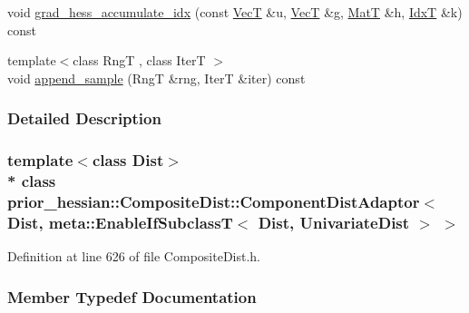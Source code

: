 \begin{DoxyCompactItemize}
\item 
void \hyperlink{classprior__hessian_1_1CompositeDist_1_1ComponentDistAdaptor_3_01Dist_00_01meta_1_1EnableIfSubclc6c9bd83bba546a81e521c87ad7ee6d3_ac58aa66e75b8ca803919fded5da5d5f9}{grad\+\_\+hess\+\_\+accumulate\+\_\+idx} (const \hyperlink{namespaceprior__hessian_a0b42fc70dec525d83fb2ac155d9ab974}{VecT} \&u, \hyperlink{namespaceprior__hessian_a0b42fc70dec525d83fb2ac155d9ab974}{VecT} \&g, \hyperlink{namespaceprior__hessian_aab58331a34ed4ef22b6022564fe74be3}{MatT} \&h, \hyperlink{namespaceprior__hessian_aa8d589f74e88bfa3b5750118acd1ab78}{IdxT} \&k) const 
\item 
{\footnotesize template$<$class RngT , class IterT $>$ }\\void \hyperlink{classprior__hessian_1_1CompositeDist_1_1ComponentDistAdaptor_3_01Dist_00_01meta_1_1EnableIfSubclc6c9bd83bba546a81e521c87ad7ee6d3_a763e7c16902f2d6464001fb02cbdd929}{append\+\_\+sample} (RngT \&rng, IterT \&iter) const 
\end{DoxyCompactItemize}


\subsubsection{Detailed Description}
\subsubsection*{template$<$class Dist$>$\\*
class prior\+\_\+hessian\+::\+Composite\+Dist\+::\+Component\+Dist\+Adaptor$<$ Dist, meta\+::\+Enable\+If\+Subclass\+T$<$ Dist, Univariate\+Dist $>$ $>$}



Definition at line 626 of file Composite\+Dist.\+h.



\subsubsection{Member Typedef Documentation}

